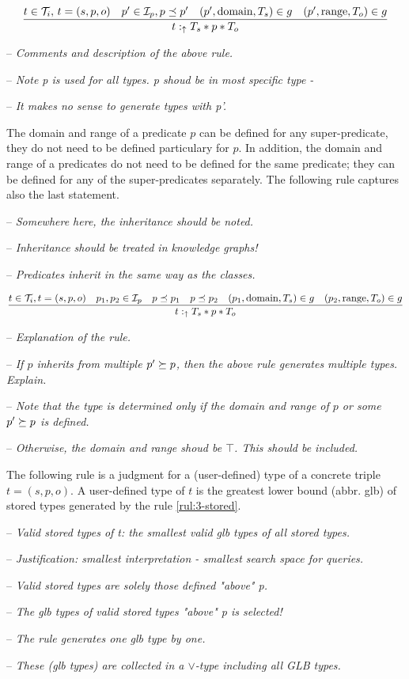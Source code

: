 \documentclass[runningheads]{llncs}
\newcommand{\uarr}{\uparrow}
\newcommand{\I}{{\cal I}}
\newcommand{\T}{{\cal T}}
\newcommand{\Ti}{{\cal T}_i}
\newcommand{\notes}[1]{\noindent\begin{small}-- \emph{#1}\\\end{small}}
\begin{document}
\begin{equation}
\label{rul:3-stored}
\dfrac{t\in\T_i,\, t=(s,p,o)\quad p'\in\I_p, p\preceq\/p'\quad (p',\text{domain},T_s)\in\/g\quad (p',\text{range},T_o)\in\/g}
      {t:_\uarr\/T_s*p*T_o}
\end{equation}


\medskip
\notes{Comments and description of the above rule.}
\notes{Note p is used for all types. p shoud be in most specific type -}
\notes{It makes no sense to generate types with p'.} 

The domain and range of a predicate $p$ can be defined for any
super-predicate, they do not need to be defined particulary for
$p$. In addition, the domain and range of a predicates do not need to
be defined for the same predicate; they can be defined for any of the
super-predicates separately. The following rule captures also the last
statement.

\medskip
\notes{Somewhere here, the inheritance should be noted.}
\notes{Inheritance should be treated in knowledge graphs!}
\notes{Predicates inherit in the same way as the classes.}

\begin{equation}
\label{rul:3-stored1}
\dfrac{t\in\Ti, t=(s,p,o)\quad p_1,p_2\in\I_p\quad p\preceq\/p_1\quad p\preceq\/p_2\quad (p_1,\text{domain},T_s)\in\/g
                \quad (p_2,\text{range},T_o)\in\/g}
      {t:_\uarr\/T_s*p*T_o}
\end{equation}

\notes{Explanation of the rule.}
\notes{If $p$ inherits from multiple $p'\succeq\/p$, then the above rule generates multiple types. Explain.}
\notes{Note that the type is determined only if the domain and range of $p$ or some $p'\succeq\/p$ is defined.}
\notes{Otherwise, the domain and range shoud be $\top$. This should be included.}

The following rule is a judgment for a (user-defined) type of a
concrete triple $t=(s,p,o)$. A user-defined type of $t$ is the
greatest lower bound (abbr. glb) of stored types generated by the rule
\ref{rul:3-stored}.

\medskip
\notes{Valid stored types of t: the smallest valid glb types of all stored types.}
\notes{Justification: smallest interpretation - smallest search space for queries.}
\notes{Valid stored types are solely those defined "above" p.}
\notes{The glb types of valid stored types "above" p is selected!}
\notes{The rule generates one glb type by one.}
\notes{These (glb types) are collected in a $\lor$-type including all GLB types.}
\end{document}
